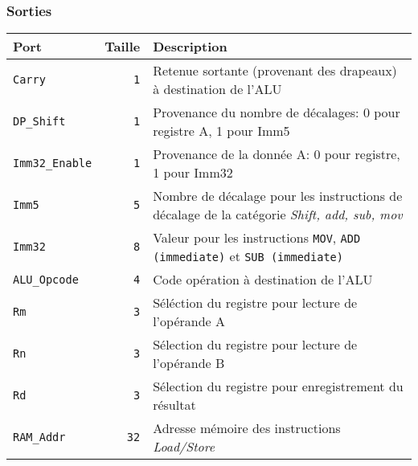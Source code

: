 \documentclass{article}
\begin{document}
    \subsubsection{Sorties}

    \begin{tabular}{|l|r|l|}
        \hline
        \textbf{Port}           & \textbf{Taille} & \textbf{Description}                                                                               \\
        \hline

        \hline
        \texttt{Carry}        & \texttt{1}      & Retenue sortante (provenant des drapeaux) à destination de l'ALU                                   \\
        \hline
        \texttt{DP\_Shift}     & \texttt{1}      & Provenance du nombre de décalages: 0 pour registre A, 1 pour Imm5                                  \\
        \hline
        \texttt{Imm32\_Enable} & \texttt{1}      & Provenance de la donnée A: 0 pour registre, 1 pour Imm32                                           \\
        \hline
        \texttt{Imm5}         & \texttt{5}      & Nombre de décalage pour les instructions de décalage de la catégorie \textit{Shift, add, sub, mov} \\
        \hline
        \texttt{Imm32}        & \texttt{8}      & Valeur pour les instructions \texttt{MOV}, \texttt{ADD (immediate)} et \texttt{SUB (immediate)}    \\
        \hline
        \texttt{ALU\_Opcode}   & \texttt{4}      & Code opération à destination de l'ALU                                                              \\
        \hline
        \texttt{Rm}           & \texttt{3}      & Séléction du registre pour lecture de l'opérande A                                                 \\
        \hline
        \texttt{Rn}           & \texttt{3}      & Sélection du registre pour lecture de l'opérande B                                                 \\
        \hline
        \texttt{Rd}           & \texttt{3}      & Sélection du registre pour enregistrement du résultat                                              \\
        \hline
        \texttt{RAM\_Addr}     & \texttt{32}     & Adresse mémoire des instructions \textit{Load/Store}                                               \\

\end{tabular}
\end{document}
